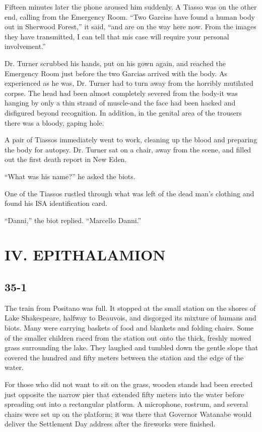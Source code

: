 \documentclass[]{article}
\begin{document}
{Fifteen minutes later the phone aroused him suddenly.  A Tiasso was on the other end, calling from the Emergency Room.  “Two Garcias have found a human body out in Sherwood Forest,” it said, “and are on the way here now.  From the images they have transmitted, I can tell that mis case will require your personal involvement.”

Dr.  Turner scrubbed his hands, put on his gown again, and reached the Emergency Room just before the two Garcias arrived with the body.  As experienced as he was, Dr.  Turner had to turn away from the horribly mutilated corpse.  The head had been almost completely severed from the body-it was hanging by only a thin strand of muscle-and the face had been hacked and disfigured beyond recognition.  In addition, in the genital area of the trousers there was a bloody, gaping hole.

A pair of Tiassos immediately went to work, cleaning up the blood and preparing the body for autopsy.  Dr.  Turner sat on a chair, away from the scene, and filled out the first death report in New Eden.

“What was his name?” he asked the biots.

One of the Tiassos rustled through what was left of the dead man’s clothing and found his ISA identification card.

“Danni,” the biot replied.  “Marcello Danni.”


\section{IV.  EPITHALAMION}



\subsection*{35-1}

The train from Positano was full.  It stopped at the small station on the shores of Lake Shakespeare, halfway to Beauvois, and disgorged its mixture of humans and biots.  Many were carrying baskets of food and blankets and folding chairs.  Some of the smaller children raced from the station out onto the thick, freshly mowed grass surrounding the lake.  They laughed and tumbled down the gentle slope that covered the hundred and fifty meters between the station and the edge of the water.

For those who did not want to sit on the grass, wooden stands had been erected just opposite the narrow pier that extended fifty meters into the water before spreading out into a rectangular platform.  A microphone, rostrum, and several chairs were set up on the platform; it was there that Governor Watanabe would deliver the Settlement Day address after the fireworks were finished.

}
\end{document}
